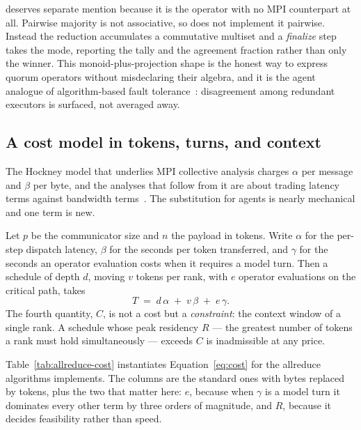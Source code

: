  deserves separate mention because it is the operator with no
MPI counterpart at all.  Pairwise majority is not associative, so \ampi{} does
not implement it pairwise.  Instead the reduction accumulates a commutative
multiset and a \emph{finalize} step takes the mode, reporting the tally and the
agreement fraction rather than only the winner.  This monoid-plus-projection
shape is the honest way to express quorum operators without misdeclaring their
algebra, and it is the agent analogue of algorithm-based fault
tolerance~\cite{huang1984abft}: disagreement among redundant executors is
surfaced, not averaged away.

\subsection{A cost model in tokens, turns, and context}

The Hockney model that underlies MPI collective analysis charges $\alpha$ per
message and $\beta$ per byte, and the analyses that follow from it are about
trading latency terms against bandwidth terms~\cite{hockney1994,chan2007}.  The
substitution for agents is nearly mechanical and one term is new.

Let $p$ be the communicator size and $n$ the payload in tokens.  Write
$\alpha$ for the per-step dispatch latency, $\beta$ for the seconds per token
transferred, and $\gamma$ for the seconds an operator evaluation costs when it
requires a model turn.  Then a schedule of depth $d$, moving $v$ tokens per
rank, with $e$ operator evaluations on the critical path, takes
\begin{equation}
T \;=\; d\,\alpha \;+\; v\,\beta \;+\; e\,\gamma .
\label{eq:cost}
\end{equation}
The fourth quantity, $C$, is not a cost but a \emph{constraint}: the context
window of a single rank.  A schedule whose peak residency
$R$ --- the greatest number of tokens a rank must hold simultaneously ---
exceeds $C$ is inadmissible at any price.

Table~\ref{tab:allreduce-cost} instantiates
Equation~\ref{eq:cost} for the allreduce algorithms \ampi{} implements.  The
columns are the standard ones with bytes replaced by tokens, plus the two that
matter here: $e$, because when $\gamma$ is a model turn it dominates every
other term by three orders of magnitude, and $R$, because it decides
feasibility rather than speed.

